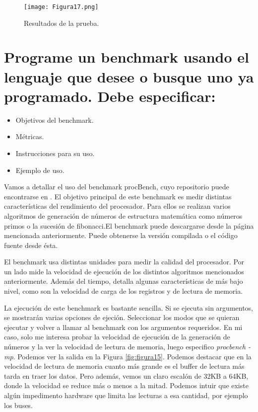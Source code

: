 \begin{figure}[H] 
\centering
\texttt{[image: Figura17.png]}  
\caption{Resultados de la prueba.}\label{fig:figura17}
\end{figure}






\section{Programe un benchmark usando el lenguaje que desee o busque uno ya programado. Debe especificar:}
\begin{itemize}
  \item Objetivos del benchmark.
	\item Métricas.
	\item Instrucciones para su uso.
	\item Ejemplo de uso.
\end{itemize}

Vamos a detallar el uso del benchmark procBench, cuyo repositorio puede encontrarse en \cite{procbench}. El objetivo principal
de este benchmark es medir distintas características del rendimiento del procesador. Para ellos se realizan varios algoritmos
de generación de números de estructura matemática como números primos o la sucesión de fibonacci.El benchmark puede 
descargarse desde la página mencionada anteriormente. Puede obtenerse la versión compilada o el código fuente desde ésta.

\vspace{5mm}

El benchmark usa distintas unidades para medir la calidad del procesador. Por un lado mide la velocidad de ejecución de los 
distintos algoritmos mencionados anteriormente.
Además del tiempo, detalla algunas características de más bajo nivel, como son la velocidad de carga de los registros y de lectura
de memoria.

\vspace{5mm}

La ejecución de este benchmark es bastante sencilla. Si se ejecuta sin argumentos, se mostrarán varias opciones de ejeción.
Seleccionar los modos que se quieran ejecutar y volver a llamar al benchmark con los argumentos requeridos.
En mi caso, solo me interesa probar la velocidad de ejecución de la generación de números y la ver la velocidad de lectura de memoria,
luego especifico \textit{procbench -mp}. Podemos ver la salida en la Figura \ref{fig:figura15}. Podemos destacar que en la velocidad
de lectura de memoria cuanto más grande es el buffer de lectura más tarda en traer los datos. Pero además, vemos un claro escalón de 32KB
a 64KB, donde la velocidad se reduce más o menos a la mitad. Podemos intuir que existe algún impedimento hardware que
limita las lecturas a esa cantidad, por ejemplo los buses.



